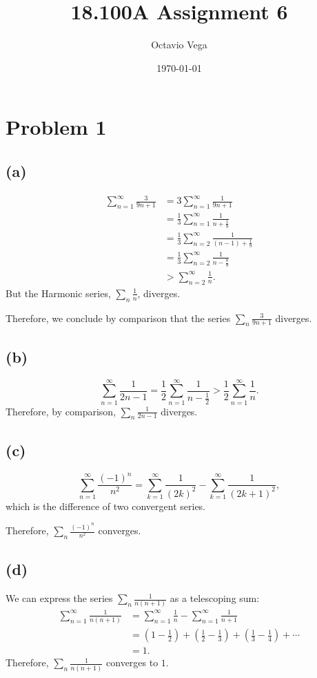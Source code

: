 \documentclass{article}
\title{18.100A Assignment 6}
\author{Octavio Vega}
\date\today
\begin{document}
\maketitle
	
\section*{Problem 1}
\subsection*{(a)}
\begin{align}
	\sum_{n=1}^{\infty} \frac{3}{9n+1} &= 3\sum_{n=1}^{\infty} \frac{1}{9n+1} \\
	&= \frac{1}{3}\sum_{n=1}^{\infty}\frac{1}{n+\frac{1}{9}} \\
	&= \frac{1}{3}\sum_{n=2}^{\infty}\frac{1}{(n-1)+\frac{1}{9}} \\
	&= \frac{1}{3}\sum_{n=2}^{\infty} \frac{1}{n-\frac{8}{9}} \\
	&> \sum_{n=2}^{\infty} \frac{1}{n}.
\end{align}
But the Harmonic series, $\sum_n \frac{1}{n}$, diverges.

Therefore, we conclude by comparison that the series $\sum_n \frac{3}{9n+1}$ diverges.

\subsection*{(b)}
\begin{equation}
	\sum_{n=1}^{\infty}\frac{1}{2n-1} = \frac{1}{2}\sum_{n=1}^{\infty}\frac{1}{n-\frac{1}{2}} > \frac{1}{2}\sum_{n=1}^{\infty}\frac{1}{n}.
\end{equation}
Therefore, by comparison, $\sum_n \frac{1}{2n-1}$ diverges.

\subsection*{(c)}
\begin{equation}
	\sum_{n=1}^{\infty} \frac{(-1)^n}{n^2} = \sum_{k=1}^{\infty}\frac{1}{(2k)^2} - \sum_{k=1}^{\infty}\frac{1}{(2k+1)^2},
\end{equation}
which is the difference of two convergent series. 

Therefore, $\sum_n \frac{(-1)^n}{n^2}$ converges.

\subsection*{(d)}
We can express the series $\sum_n \frac{1}{n(n+1)}$ as a telescoping sum:
\begin{align}
	\sum_{n=1}^{\infty}\frac{1}{n(n+1)} &= \sum_{n=1}^{\infty} \frac{1}{n} - \sum_{n=1}^{\infty}\frac{1}{n+1} \\
	&= \left(1-\frac{1}{2}\right) + \left(\frac{1}{2} - \frac{1}{3}\right) + \left(\frac{1}{3} - \frac{1}{4}\right) + \cdots \\
	&= 1.
\end{align}
Therefore, $\sum_n \frac{1}{n(n+1)}$ converges to $1$.
\end{document}
